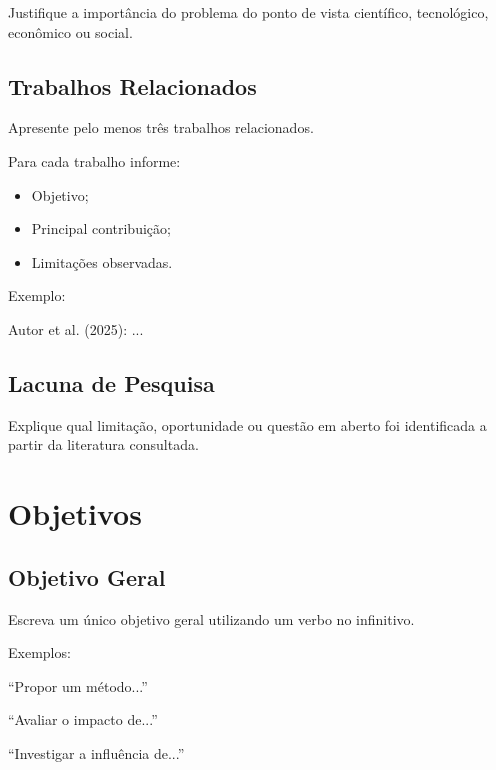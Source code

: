 \documentclass[10pt,a4paper]{extarticle}
\begin{document}
\begin{respbox}
Justifique a importância do problema do ponto de vista científico,
tecnológico, econômico ou social.
\end{respbox}


\subsection{Trabalhos Relacionados}

\begin{respbox}
Apresente pelo menos três trabalhos relacionados.

Para cada trabalho informe:

\begin{itemize}
    \item Objetivo;
    \item Principal contribuição;
    \item Limitações observadas.
\end{itemize}

Exemplo:

Autor et al. (2025): ...
\end{respbox}


\subsection{Lacuna de Pesquisa}

\begin{respbox}
Explique qual limitação, oportunidade ou questão em aberto foi
identificada a partir da literatura consultada.
\end{respbox}


\section{Objetivos}

\subsection{Objetivo Geral}

\begin{respbox}
Escreva um único objetivo geral utilizando um verbo no infinitivo.

Exemplos:

``Propor um método...''

``Avaliar o impacto de...''

``Investigar a influência de...''
\end{respbox}
\end{document}
